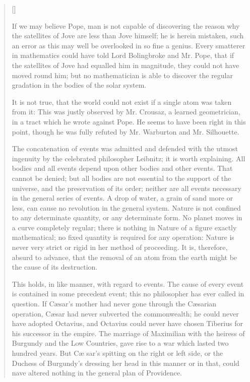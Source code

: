 \begin{verse}[\versewidth]
{If we may believe Pope, man is not capable of discovering the reason
why the satellites of Jove are less than Jove himself; he is herein
mistaken, such an error as this may well be overlooked in so fine a
genius. Every smatterer in mathematics could have told Lord
Bolingbroke and Mr. Pope, that if the satellites of Jove had equalled
him in magnitude, they could not have moved round him; but no
mathematician is able to discover the regular gradation in the bodies
of the solar system.

It is not true, that the world could not exist if a single atom was
taken from it: This was justly observed by Mr. Crousaz, a learned
geometrician, in a tract which he wrote against Pope. He seems to have
been right in this point, though he was fully refuted by Mr. Warburton
and Mr. Silhouette.

The concatenation of events was admitted and defended with the utmost
ingenuity by the celebrated philosopher Leibnitz; it is worth
explaining. All bodies and all events depend upon other bodies and
other events. That cannot be denied; but all bodies are not essential
to the support of the universe, and the preservation of its order;
neither are all events necessary in the general series of events. A
drop of water, a grain of sand more or less, can cause no revolution
in the general system. Nature is not confined to any determinate
quantity, or any determinate form. No planet moves in a curve
completely regular; there is nothing in Nature of a figure exactly
mathematical; no fixed quantity is required for any operation: Nature
is never very strict or rigid in her method of proceeding. It is,
therefore, absurd to advance, that the removal of an atom from the
earth might be the cause of its destruction.

This holds, in like manner, with regard to events. The cause of every
event is contained in some precedent event; this no philosopher has
ever called in question. If C\ae sar's mother had never gone through
the C\ae sarian operation, C\ae sar had never subverted the
commonwealth; he could never have adopted Octavius, and Octavius could
never have chosen Tiberius for his successor in the empire. The
marriage of Maximilian with the heiress of Burgundy and the Low
Countries, gave rise to a war which lasted two hundred years. But C\ae
sar's spitting on the right or left side, or the Duchess of Burgundy's
dressing her head in this manner or in that, could nave altered
nothing in the general plan of Providence.

}
\end{verse}
